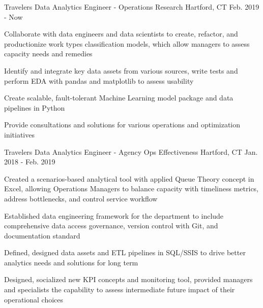 

\begin{cventries}

  \cventry
    {Travelers} %
    {Data Analytics Engineer - Operations Research} %
    {Hartford, CT} %
    {Feb. 2019 - Now} %
    {
      \begin{cvitems} %
        \item {Collaborate with data engineers and data scientists to create, refactor, and productionize 
        work types classification models, which allow managers to assess capacity needs and remedies}
        \item {Identify and integrate key data assets from various sources, write tests and perform EDA with pandas and matplotlib
        to assess usability}
        \item {Create scalable, fault-tolerant Machine Learning model package and data pipelines in Python}
        \item {Provide consultations and solutions for various operations and optimization initiatives}
      \end{cvitems}
    }

  \cventry
    {Travelers} %
    {Data Analytics Engineer - Agency Ops Effectiveness} %
    {Hartford, CT} %
    {Jan. 2018 - Feb. 2019} %
    {
      \begin{cvitems} %
      \item {Created a scenarios-based analytical tool with applied Queue Theory concept in Excel, allowing Operations Managers
      to balance capacity with timeliness metrics, address bottlenecks, and control service workflow}
      \item {Established data engineering framework for the department to include comprehensive data access 
      governance, version control with Git, and documentation standard}
      \item {Defined, designed data assets and ETL pipelines in SQL/SSIS to drive better analytics needs and solutions for 
      long term}
      \item {Designed, socialized new KPI concepts and monitoring tool, provided managers and specialists the 
      capability to assess intermediate future impact of their operational choices}
      \end{cvitems}
    }


\end{cventries}
